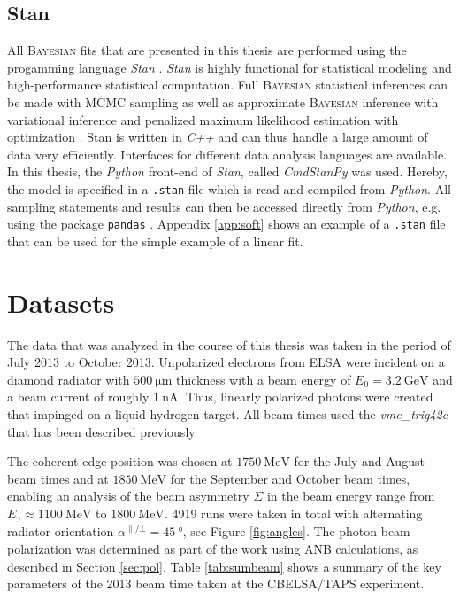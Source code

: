 \subsection{Stan}
All \textsc{Bayesian} fits that are presented in this thesis are performed using the progamming language \emph{Stan} \cite{stan}. \emph{Stan} is highly functional for statistical modeling and high-performance statistical computation. Full \textsc{Bayesian} statistical inferences can be made with MCMC sampling as well as approximate \textsc{Bayesian} inference with variational inference and penalized maximum likelihood estimation with optimization \cite{stan}. Stan is written in \emph{C++} and can thus handle a large amount of data very efficiently. Interfaces for different data analysis languages are available. In this thesis, the \emph{Python} \cite{python} front-end of \emph{Stan}, called \emph{CmdStanPy} was used. Hereby, the model is specified in a \texttt{.stan} file which is read and compiled from \emph{Python}. All sampling statements and results can then be accessed directly from \emph{Python}, e.g. using the package \texttt{pandas} \cite{pandas}. Appendix \ref{app:soft} shows an example of a \texttt{.stan} file that can be used for the simple example of a linear fit.
\section{Datasets}
The data that was analyzed in the course of this thesis was taken in the period of July 2013 to October 2013. Unpolarized electrons from ELSA were incident on a diamond radiator with $\SI{500}{\micro\meter}$ thickness with a beam energy of $E_0=\SI{3.2}{\giga\eV}$ and a beam current of roughly $\SI{1}{\nano\ampere}$. Thus, linearly polarized photons were created that impinged on a liquid hydrogen target. All beam times used the \emph{vme\_trig42c} that has been described previously.

The coherent edge position was chosen at $\SI{1750}{\mega\eV}$ for the July and August beam times and at $\SI{1850}{\mega\eV}$ for the September and October beam times, enabling an analysis of the beam asymmetry $\Sigma$ in the beam energy range from $E_\gamma\approx\SI{1100}{\mega\eV}$ to $\SI{1800}{\mega\eV}$.  4919 runs were taken in total  with alternating radiator orientation $\alpha^{\parallel/\bot}=\SI{45}{\degree}$, see Figure \ref{fig:angles}. The photon beam polarization was determined as part of the work \cite{farahphd} using ANB calculations, as described in Section \ref{sec:pol}. Table \ref{tab:sumbeam} shows a summary of the key parameters of the 2013 beam time taken at the CBELSA/TAPS experiment.

